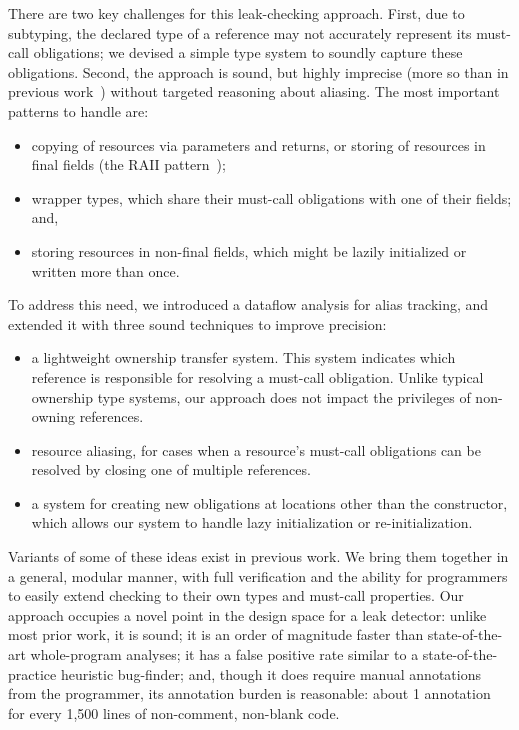 There are two key challenges for this leak-checking approach.  First,
due to subtyping, the declared type of a reference may not accurately represent
its must-call obligations; we devised a simple type system to soundly capture
these obligations.  Second, the approach is sound, but highly imprecise (more so than in
previous work~\cite{KelloggRSSE2020}) without targeted reasoning about
aliasing.  The most important patterns to
handle are:
\begin{itemize}
\item copying of resources via parameters and returns, or storing of resources in
final fields (the RAII pattern~\cite{raii});
\item wrapper types, which share their must-call obligations with one of their fields; and,
\item storing resources in non-final fields, which might be lazily initialized or
  written more than once.
\end{itemize}
To address this need,
we introduced a
dataflow analysis for alias tracking, and extended it with three sound
techniques to improve precision:
\begin{itemize}
\item a lightweight ownership transfer system. This system
  indicates which reference is responsible for resolving a must-call
  obligation. Unlike typical ownership type systems, our approach does
  not impact the privileges of non-owning references.
\item resource aliasing, for cases
  when
  a resource's must-call obligations
  can be resolved by closing one of multiple references.
\item a system for creating new obligations at locations other than the
  constructor, which allows our system to handle lazy initialization or re-initialization.
\end{itemize}
Variants of some of these ideas exist in previous work.  We bring
them together in a general, modular manner, with full verification and
the ability for programmers to easily extend checking to their own
types and must-call properties.
%
Our approach occupies a novel point in the design space for a leak detector:
unlike most prior work, it is sound; it is an order of magnitude faster than
state-of-the-art whole-program analyses; it has a false positive rate similar
to a state-of-the-practice heuristic bug-finder; and, though it does require manual
annotations from the programmer, its annotation burden is reasonable: about
1 annotation for every 1,500 lines of non-comment, non-blank code. 

